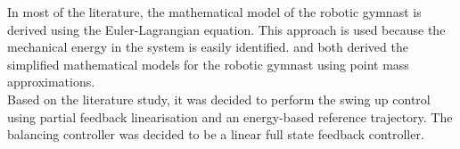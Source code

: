 In most of the literature, the mathematical model of the robotic gymnast is derived using the Euler-Lagrangian equation. This approach is used because the mechanical energy in the system is easily identified. \citet{derivation_controlPlaner} and \citet{tedrake} both derived the simplified mathematical models for the robotic gymnast using point mass approximations. \\

Based on the literature study, it was decided to perform the swing up control using partial feedback linearisation and an energy-based reference trajectory. The balancing controller was decided to be a linear full state feedback controller.

